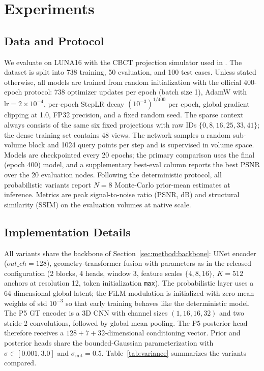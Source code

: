 
\section{Experiments}
\label{sec:exp}

\subsection{Data and Protocol}
\label{sec:exp:protocol}

We evaluate on LUNA16 \cite{setio2017luna16} with the CBCT projection
simulator used in \cite{lin2024difgaussian}. The dataset is split into
738 training, 50 evaluation, and 100 test cases. Unless stated otherwise,
all models are trained from random initialization with the official
400-epoch protocol: 738 optimizer updates per epoch (batch size 1),
AdamW with $\mathrm{lr}=2{\times}10^{-4}$, per-epoch StepLR decay
$(10^{-3})^{1/400}$ per epoch, global gradient clipping at 1.0, FP32
precision, and a fixed random seed. The sparse context always consists
of the same six fixed projections with raw IDs $\{0,8,16,25,33,41\}$;
the dense training set contains 48 views. The network samples a random
sub-volume block and 1024 query points per step and is supervised in
volume space. Models are checkpointed every 20 epochs; the primary
comparison uses the final (epoch 400) model, and a supplementary
best-eval column reports the best PSNR over the 20 evaluation nodes.
Following the deterministic protocol, all probabilistic variants report
$N{=}8$ Monte-Carlo prior-mean estimates at inference. Metrics are peak
signal-to-noise ratio (PSNR, dB) and structural similarity (SSIM) on
the evaluation volumes at native scale.

\subsection{Implementation Details}
\label{sec:exp:impl}

All variants share the backbone of Section~\ref{sec:method:backbone}:
UNet encoder ($out\_ch=128$), geometry-transformer fusion with
parameters as in the released configuration (2 blocks, 4 heads, window
3, feature scales $\{4,8,16\}$, $K{=}512$ anchors at resolution 12,
token initialization \texttt{max}). The probabilistic layer uses a
64-dimensional global latent; the FiLM modulation is initialized with
zero-mean weights of std $10^{-3}$ so that early training behaves like
the deterministic model. The P5 GT encoder is a 3D CNN with channel
sizes $(1,16,16,32)$ and two stride-2 convolutions, followed by global
mean pooling. The P5 posterior head therefore receives a
$128+7+32$-dimensional conditioning vector. Prior and posterior heads
share the bounded-Gaussian parameterization with $\sigma\in[0.001,3.0]$
and $\sigma_{\mathrm{init}}=0.5$. Table~\ref{tab:variance} summarizes
the variants compared.

